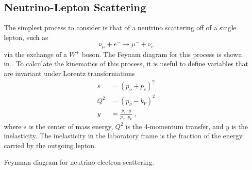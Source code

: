 \subsection{Neutrino-Lepton Scattering}
The simplest process to consider is that of a neutrino scattering off of a single lepton, such as
\begin{equation}
    \nu_\mu + e^- \rightarrow \mu^- + \nu_e
\end{equation}
via the exchange of a $W^+$ boson.
The Feynam diagram for this process is shown in .
To calculate the kinematics of this process, it is useful to define variables that are invariant under Lorentz transformations
\begin{equation}
\begin{aligned}
    s &= (p_\nu + p_e)^2 \\
    Q^2 &= (p_\nu - k_\nu)^2 \\
    y &= \frac{p_e \cdot q}{p_e \cdot p_\nu}\;,
\end{aligned}\label{eq:kinematic-quantities}
\end{equation}
where $s$ is the center of mass energy, $Q^2$ is the 4-momentum transfer, and $y$ is the inelasticity.
The inelasticity in the laboratory frame is the fraction of the energy carried by the outgoing lepton.
\begin{marginfigure}
\caption{Feynman diagram for neutrino-electron scattering.\label{fig:feynman-nue-scatter}}
\end{marginfigure}
